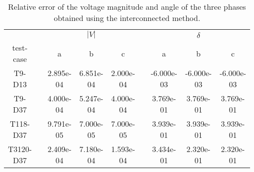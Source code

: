 \begin{table}
\renewcommand{\arraystretch}{1.3}
\centering
\label{}\hspace{2cm}\caption{Relative error of the voltage magnitude and angle of the three phases obtained using the interconnected method. }
\begin{adjustbox}{width=1\textwidth} %
\small
\begin{tabular}{ccccccccc}
\toprule
{} && \multicolumn{3}{c}{$|V|$} && \multicolumn{3}{c}{$\delta$}  \\
\cmidrule{3-5}\cmidrule{7-9}
 test-case &&        a &        b &       c &&        a &       b &        c \\
\midrule
T9-D13    &&  2.895e-04 &  6.851e-04 &  2.000e-04 &&  -6.000e-03 &  -6.000e-03 &  -6.000e-03 \\
T9-D37    &&  4.000e-04 &  5.247e-04 &  4.000e-04 &&   3.769e-01 &   3.769e-01 &   3.769e-01 \\
T118-D37  &&  9.791e-05 &  7.000e-05 &  7.000e-05 &&   3.939e-01 &   3.939e-01 &   3.939e-01 \\
T3120-D37 &&  2.409e-04 &  7.180e-04 &  1.593e-04 &&   3.434e-01 &   2.320e-01 &   2.320e-01 \\
\bottomrule
\end{tabular}
\end{adjustbox}
\end{table}